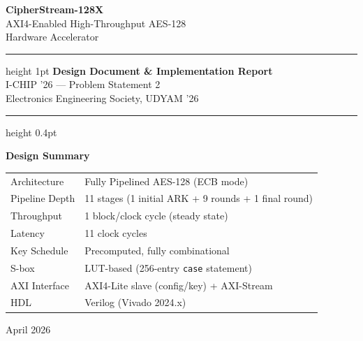 \documentclass[12pt,a4paper]{article}
\begin{document}

\begin{titlepage}
\begin{center}
  \vspace*{1.5cm}
  {\Huge\bfseries\color{primaryblue} CipherStream-128X}\\[0.5em]
  {\Large\color{accentorange} AXI4-Enabled High-Throughput AES-128\\Hardware Accelerator}\\[2em]
  \hrule height 1pt
  \vspace{1em}
  {\large\bfseries Design Document \& Implementation Report}\\[0.5em]
  {\normalsize I-CHIP '26 --- Problem Statement 2\\
  Electronics Engineering Society, UDYAM '26}\\[2em]
  \hrule height 0.4pt
  \vspace{2em}

  \begin{tcolorbox}[colback=lightgray, colframe=primaryblue,
                   width=0.85\textwidth, arc=4pt]
    \centering
    \textbf{Design Summary}\\[0.5em]
    \begin{tabular}{ll}
      Architecture & Fully Pipelined AES-128 (ECB mode)\\
      Pipeline Depth & 11 stages (1 initial ARK + 9 rounds + 1 final round)\\
      Throughput & 1 block/clock cycle (steady state)\\
      Latency & 11 clock cycles\\
      Key Schedule & Precomputed, fully combinational\\
      S-box & LUT-based (256-entry \texttt{case} statement)\\
      AXI Interface & AXI4-Lite slave (config/key) + AXI-Stream\\
      HDL & Verilog (Vivado 2024.x)\\
    \end{tabular}
  \end{tcolorbox}

  \vfill
  {\small April 2026}
\end{center}
\end{titlepage}

\tableofcontents
\newpage
\end{document}
